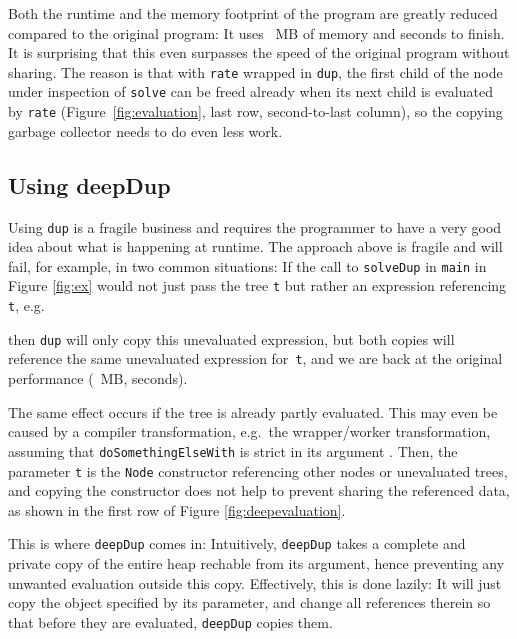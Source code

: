 \documentclass[preprint]{sigplanconf}
\theoremstyle{nonumberplain}
\newcommand{\li}{\lstinline[style=Haskell]}
\begin{document}
Both the runtime and the memory footprint of the program are greatly reduced compared to the original program: It uses ~MB of memory and  seconds to finish. It is surprising that this even surpasses the speed of the original program without sharing. The reason is that with \li-rate- wrapped in \li-dup-, the first child of the node under inspection of \li-solve- can be freed already when its next child is evaluated by \li-rate- (Figure~\ref{fig:evaluation}, last row, second-to-last column), so the copying garbage collector needs to do even less work.

\subsection{Using deepDup}

\label{sec:deepdup}
Using \li-dup- is a fragile business and requires the programmer to have a very good idea about what is happening at runtime. The approach above is fragile and will fail, for example, in two common situations: If the call to \li-solveDup- in \li-main- in Figure \ref{fig:ex} would not just pass the tree \li-t- but rather an expression referencing \li-t-, e.g.
then \li-dup- will only copy this unevaluated expression, but both copies will reference the same unevaluated expression for~\li-t-, and we are back at the original performance (~MB,  seconds).

The same effect occurs if the tree is already partly evaluated. This may even be caused by a compiler transformation, e.g.\ the wrapper/worker transformation, assuming that \li-doSomethingElseWith- is strict  in its argument \citep{unboxed}. Then, the parameter \li-t- is the \li-Node- constructor referencing other nodes or unevaluated trees, and copying the constructor does not help to prevent sharing the referenced data, as shown in the first row of Figure \ref{fig:deepevaluation}.

This is where \li-deepDup- comes in:
Intuitively, \li-deepDup- takes a complete and private copy of the entire heap rechable from its argument, hence preventing any unwanted evaluation outside this copy. Effectively, this is done lazily: It will just copy the object specified by its parameter, and change all references therein so that before they are evaluated, \li-deepDup- copies them.
\end{document}
